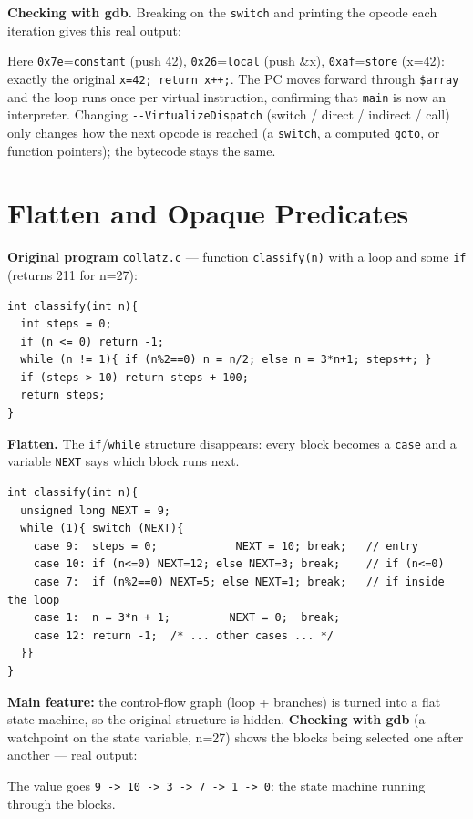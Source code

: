 \documentclass[11pt,a4paper]{article}
\newcommand{\code}[1]{\texttt{\small #1}}
\begin{document}
\textbf{Checking with gdb.} Breaking on the \code{switch} and printing the opcode each iteration
gives this real output:

Here \code{0x7e}=\code{constant} (push 42), \code{0x26}=\code{local} (push \&x), \code{0xaf}=\code{store}
(x=42): exactly the original \code{x=42; return x++;}. The PC moves forward through \code{\$array} and
the loop runs once per virtual instruction, confirming that \code{main} is now an interpreter. Changing
\code{-{}-VirtualizeDispatch} (switch / direct / indirect / call) only changes how the next opcode is
reached (a \code{switch}, a computed \code{goto}, or function pointers); the bytecode stays the same.

\section{Flatten and Opaque Predicates}
\textbf{Original program} \code{collatz.c} --- function \code{classify(n)} with a loop and some
\code{if} (returns 211 for n=27):
\begin{lstlisting}[style=base]
int classify(int n){
  int steps = 0;
  if (n <= 0) return -1;
  while (n != 1){ if (n%2==0) n = n/2; else n = 3*n+1; steps++; }
  if (steps > 10) return steps + 100;
  return steps;
}
\end{lstlisting}

\textbf{Flatten.} The \code{if}/\code{while} structure disappears: every block becomes a \code{case}
and a variable \code{NEXT} says which block runs next.
\begin{lstlisting}
int classify(int n){
  unsigned long NEXT = 9;
  while (1){ switch (NEXT){
    case 9:  steps = 0;            NEXT = 10; break;   // entry
    case 10: if (n<=0) NEXT=12; else NEXT=3; break;    // if (n<=0)
    case 7:  if (n%2==0) NEXT=5; else NEXT=1; break;   // if inside the loop
    case 1:  n = 3*n + 1;         NEXT = 0;  break;
    case 12: return -1;  /* ... other cases ... */
  }}
}
\end{lstlisting}
\textbf{Main feature:} the control-flow graph (loop + branches) is turned into a flat state machine,
so the original structure is hidden. \textbf{Checking with gdb} (a watchpoint on the state variable,
n=27) shows the blocks being selected one after another --- real output:

The value goes \code{9 -> 10 -> 3 -> 7 -> 1 -> 0}: the state machine running through the blocks.
\end{document}
